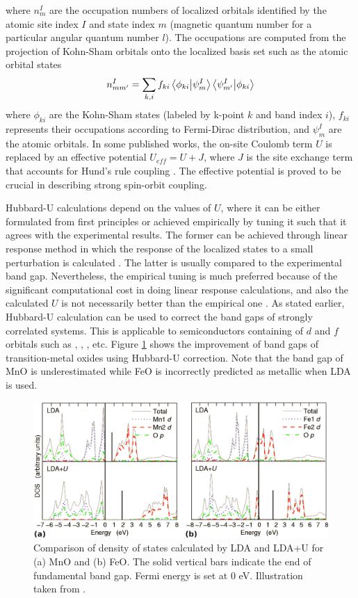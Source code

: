 where $n^I_{m}$ are the occupation numbers of localized orbitals identified by the atomic site index $I$ and state index $m$ (magnetic quantum number for a particular angular quantum number $l$). The occupations are computed from the projection of Kohn-Sham orbitals onto the localized basis set such as the atomic orbital states \citep{Himmetoglu2011}
\begin{equation}
	n^I_{mm'} = \sum_{k,i} f_{ki} \braket{\phi_{ki}}{\psi^I_m} \braket{\psi^I_{m'}}{\phi_{ki}}
\end{equation}
where $\phi_{ki}$ are the Kohn-Sham states (labeled by k-point $k$ and band index $i$), $f_{ki}$ represents their occupations according to Fermi-Dirac distribution, and $\psi^I_{m}$ are the atomic orbitals. In some published works, the on-site  Coulomb term $U$ is replaced by an effective potential $U_{eff} =U + J $, where $J$ is the  site exchange term that accounts for Hund's rule coupling \citep{Liechtenstein1995,Dudarev1998}. The
effective potential is proved to be crucial in describing strong spin-orbit coupling.

Hubbard-U calculations depend on the values of $U$, where it can be either formulated from first principles or achieved empirically by tuning it such that it agrees with the experimental results. The former can be achieved through linear response method in which the response of  the localized states to a small perturbation is calculated \citep{Cococcioni2005,Kulik2006}. The latter is usually compared to the experimental band gap. Nevertheless, the empirical tuning is much preferred because of the significant computational cost in doing linear response calculations, and also the calculated $U$ is not necessarily better than the empirical one \citep{Dompablo2011}. As stated earlier, Hubbard-U calculation can be used to correct the band gaps of strongly correlated systems. This is applicable to semiconductors containing of $d$ and $f$ orbitals such as , , , etc. Figure \ref{fig:hubbard} shows the improvement of band gaps of transition-metal oxides using Hubbard-U correction. Note that the band gap of MnO is underestimated while FeO is incorrectly predicted as metallic when LDA is used.

\begin{figure}[tbh!]
	\centering
	\includegraphics[width=0.8\linewidth]{"images/theory/hubbard"}
	\caption[Improvement of band gap under Hubbard Correction]{Comparison of density of states calculated by LDA and LDA+U for (a) MnO and (b) FeO. The solid vertical bars indicate the end of fundamental band gap. Fermi energy is set at 0 eV. Illustration taken from \citep{Tran2006}.}
	\label{fig:hubbard}
\end{figure}



